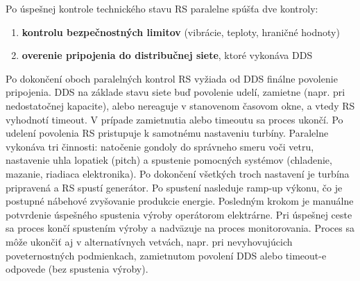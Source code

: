 \documentclass[12pt,a4paper]{article}
\begin{document}
\vspace{0.6em}
Po úspešnej kontrole technického stavu RS paralelne spúšťa dve kontroly:
\begin{enumerate}[noitemsep, topsep=2pt, leftmargin=1.5cm]
    \item \textbf{kontrolu bezpečnostných limitov} (vibrácie, teploty, hraničné hodnoty)
    \item \textbf{overenie pripojenia do distribučnej siete}, ktoré vykonáva DDS
\end{enumerate}
\vspace{0.6em}
Po dokončení oboch paralelných kontrol RS vyžiada od DDS finálne povolenie pripojenia. DDS na základe stavu siete buď povolenie udelí, zamietne (napr. pri nedostatočnej kapacite), alebo nereaguje v stanovenom časovom okne, a vtedy RS vyhodnotí timeout. V prípade zamietnutia alebo timeoutu sa proces ukončí. Po udelení povolenia RS pristupuje k samotnému nastaveniu turbíny. Paralelne vykonáva tri činnosti: natočenie gondoly do správneho smeru voči vetru, nastavenie uhla lopatiek (pitch) a spustenie pomocných systémov (chladenie, mazanie, riadiaca elektronika). Po dokončení všetkých troch nastavení je turbína pripravená a RS spustí generátor. Po spustení nasleduje ramp-up výkonu, čo je postupné nábehové zvyšovanie produkcie energie. Posledným krokom je manuálne potvrdenie úspešného spustenia výroby operátorom elektrárne. Pri úspešnej ceste sa proces končí spustením výroby a nadväzuje na proces monitorovania. Proces sa môže ukončiť aj v alternatívnych vetvách, napr. pri nevyhovujúcich poveternostných podmienkach, zamietnutom povolení DDS alebo timeout-e odpovede (bez spustenia výroby). 






\end{document}
